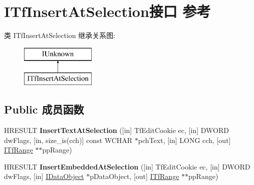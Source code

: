 \hypertarget{interface_i_tf_insert_at_selection}{}\section{I\+Tf\+Insert\+At\+Selection接口 参考}
\label{interface_i_tf_insert_at_selection}
类 I\+Tf\+Insert\+At\+Selection 继承关系图\+:\begin{figure}[H]
\begin{center}
\leavevmode
\includegraphics[height=2.000000cm]{interface_i_tf_insert_at_selection}
\end{center}
\end{figure}
\subsection*{Public 成员函数}
\begin{DoxyCompactItemize}
\item 
\mbox{\label{interface_i_tf_insert_at_selection_ab8c8a22de8a7d60d96498dcd20d5374f}} 
H\+R\+E\+S\+U\+LT {\bfseries Insert\+Text\+At\+Selection} (\mbox{[}in\mbox{]} Tf\+Edit\+Cookie ec, \mbox{[}in\mbox{]} D\+W\+O\+RD dw\+Flags, \mbox{[}in, size\+\_\+is(cch)\mbox{]} const W\+C\+H\+AR $\ast$pch\+Text, \mbox{[}in\mbox{]} L\+O\+NG cch, \mbox{[}out\mbox{]} \hyperlink{interface_i_tf_range}{I\+Tf\+Range} $\ast$$\ast$pp\+Range)
\item 
\mbox{\label{interface_i_tf_insert_at_selection_a0463ed1d48f58398800a7fb3079a179e}} 
H\+R\+E\+S\+U\+LT {\bfseries Insert\+Embedded\+At\+Selection} (\mbox{[}in\mbox{]} Tf\+Edit\+Cookie ec, \mbox{[}in\mbox{]} D\+W\+O\+RD dw\+Flags, \mbox{[}in\mbox{]} \hyperlink{interface_i_data_object}{I\+Data\+Object} $\ast$p\+Data\+Object, \mbox{[}out\mbox{]} \hyperlink{interface_i_tf_range}{I\+Tf\+Range} $\ast$$\ast$pp\+Range)
\end{DoxyCompactItemize}
